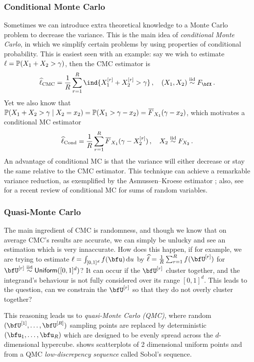 \subsubsection{Conditional Monte Carlo}

Sometimes we can introduce extra theoretical knowledge to a Monte Carlo problem to decrease the variance. This is the main idea of \emph{conditional Monte Carlo}, in which we simplify certain problems by using properties of conditional probability. This is easiest seen with an example: say we wish to estimate $\ell = \operatorname{{\mathbb P}}(X_1 + X_2 > \gamma)$, then the CMC estimator is
\[ \hat{\ell}_{\mathrm{CMC}} = \frac1R \sum_{r=1}^R \ind{ X_1^{[r]} + X_2^{[r]} > \gamma } \,,\quad (X_1,X_2) \iidDist F_{\bfX} \,. \]
Yet we also know that $\Prob(X_1 + X_2 > \gamma \mid X_2 = x_2) = \Prob(X_1 > \gamma - x_2) = \Ftail_{X_1}(\gamma - x_2)$, which motivates a conditional MC estimator
\[ \hat{\ell}_{\mathrm{Cond}} = \frac1R \sum_{r=1}^R \Ftail_{X_1}(\gamma - X_2^{[r]}) \,, \quad X_2 \iidDist F_{X_2} \,. \]
An advantage of conditional MC is that the variance will either decrease or stay the same relative to the CMC estimator. This technique can achieve a remarkable variance reduction, as exemplified by the Asmussen--Kroese estimator \cite{asmussen2006improved}; also, see \cite{asmussen2017conditional} for a recent review of conditional MC for sums of random variables.

\subsubsection{Quasi-Monte Carlo}

The main ingredient of CMC is randomness, and though we know that on average CMC's results are accurate, we can simply be unlucky and see an estimation which is very innaccurate. How does this happen, if for example, we are trying to estimate $\ell = \int_{[0,1]^d} f(\bfu) \dd u$ by $\hat{\ell} = \frac1R \sum_{r=1}^R f(\bfU^{[r]})$ for $\bfU^{[r]} \iidDist \UnifDist([0,1]^d)$? It can occur if the $\bfU^{[r]}$ cluster together, and the integrand's behaviour is not fully considered over its range $[0,1]^d$. This leads to the question, can we constrain the $\bfU^{[r]}$ so that they do not overly cluster together?

This reasoning leads us to \emph{quasi-Monte Carlo (QMC)}, where random $(\bfU^{[1]},\dots,\bfU^{[R]})$ sampling points are replaced by deterministic $(\bfu_1,\dots, \bfu_R)$ which are designed to be evenly spread across the $d$-dimensional hypercube.  shows scatterplots of 2 dimensional uniform points and from a QMC \emph{low-discrepency sequence} called Sobol's sequence.

